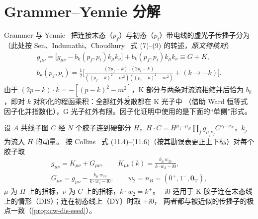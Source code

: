\section{Grammer--Yennie 分解}\label{sec:cw-gy}

\begin{remark}\label{rem:cw-gy-orig}
Grammer 与 Yennie~\cite{GrammerYennie1973} 把连接末态（$p_f$）与初态（$p_i$）带电线的虚光子传播子分为
（此处按 Sen、Indumathi、Choudhury~\cite{SenIndumathiChoudhury2019} 式 (7)–(9) 的转述，\emph{原文待核对}）
\begin{equation}\label{eq:cw-gy-orig}
\begin{gathered}
g_{\mu\nu}=\big[g_{\mu\nu}-b_k(p_f,p_i)k_\mu k_\nu\big]+b_k(p_f,p_i)k_\mu k_\nu\equiv G+K,\\
b_k(p_f,p_i)=\frac12\Big[\frac{(2p_f-k)\cdot(2p_i-k)}{((p_f-k)^2-m^2)((p_i-k)^2-m^2)}+(k\to-k)\Big].
\end{gathered}
\end{equation}
由于 $(2p-k)\cdot k=-[(p-k)^2-m^2]$，K 部分与两条对流流相缩并后恰为 $b_k$，即对 $k$ 对称化的程函乘积：全部红外发散都在 K 光子中
（借助 Ward 恒等式因子化并指数化），G 光子红外有限。因子化证明中使用的是下面的“单侧”形式。
\end{remark}

\begin{definition}[共线连接的 K/G 分解]\label{def:cw-kg-coll}
设 $A$ 共线子图 $C$ 经 $N$ 个胶子连到硬部分 $H$，$H\cdot C=H^{\mu_1\cdots\mu_N}\prod_jg_{\mu_j\nu_j}C^{\nu_1\cdots\nu_N}$，$k_j$ 为流入 $H$ 的动量。
按 Collins~\cite{Collins2011} 式 (11.4)–(11.6)（按其勘误表更正上下标）对每个胶子取
\begin{equation}\label{eq:cw-kg-coll}
\begin{gathered}
g_{\mu\nu}=K_{\mu\nu}+G_{\mu\nu},\qquad K_{\mu\nu}(k)=\frac{k_\mu\,w_{2\nu}}{k\cdot w_2-\ii0},\\
G_{\mu\nu}=g_{\mu\nu}-\frac{k_\mu\,w_{2\nu}}{k\cdot w_2-\ii0},\qquad w_2=n_B=(0^+,1^-,\bm 0_{\mathrm T}),
\end{gathered}
\end{equation}
$\mu$ 为 $H$ 上的指标，$\nu$ 为 $C$ 上的指标，$k\cdot w_2=k^+$。$-\ii0$ 适用于 K 胶子连在末态线上的情形（DIS）；连在初态线上（DY）时取 $+\ii0$，
两者都与被近似的传播子的极点一致（\cref{prop:cw-dis-seed}）。
\end{definition}

